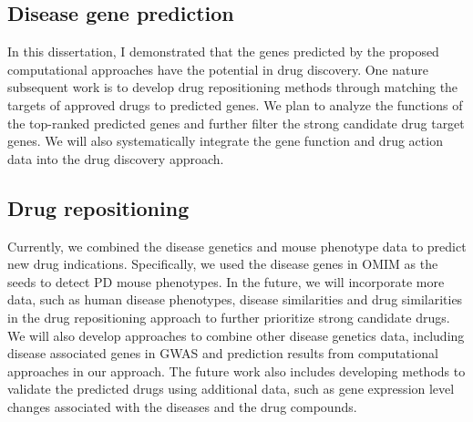 \subsection{Disease gene prediction}
In this dissertation, I demonstrated that the genes predicted by the proposed 
computational approaches have the potential in drug discovery. 
One nature subsequent work is to develop drug repositioning methods
through matching the targets of approved drugs to predicted genes.
We plan to analyze the functions of the top-ranked predicted genes
and further filter the strong candidate drug target genes.
We will also systematically integrate the gene function and drug action data
into the drug discovery approach.



\subsection{Drug repositioning}
Currently, we combined the disease genetics and mouse phenotype
data to predict new drug indications. Specifically, we used the disease genes
in OMIM as the seeds to detect PD mouse phenotypes.
In the future, we will incorporate more data, such as human disease phenotypes, 
disease similarities and drug similarities in the drug repositioning approach to 
further prioritize strong candidate drugs.  We will also 
develop approaches to combine other disease genetics data, including disease 
associated genes in GWAS and prediction results from computational approaches 
in our approach.
The future work also includes developing methods to validate the
predicted drugs using additional data, such as gene expression level changes associated with
the diseases and the drug compounds.










